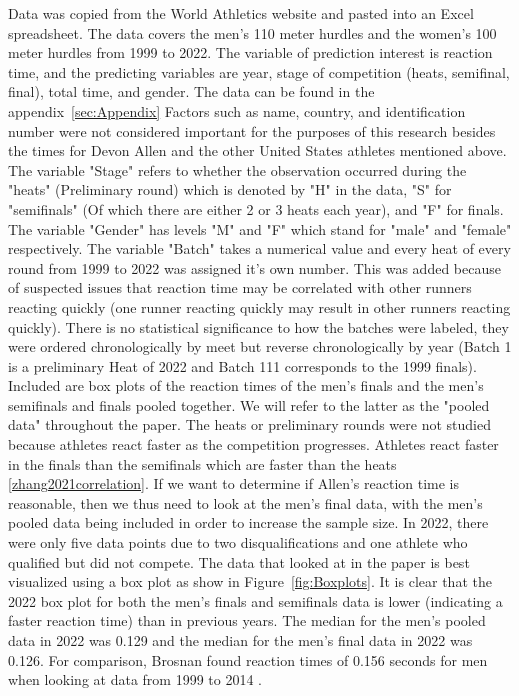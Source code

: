 \documentclass[12pt, letterpaper, titlepage]{article}
\begin{document}
Data was copied from the World Athletics website and pasted into an Excel
spreadsheet. The data covers the men's 110 meter hurdles and the women's 100
meter hurdles from 1999 to 2022.  The variable of prediction interest is reaction
time, and the predicting variables are year, stage of competition (heats, 
semifinal, final), total time, and gender.  The data can be found in the
appendix~\ref{sec:Appendix} 
Factors such as name, country, and identification number were
not considered important for the purposes of this research besides the times for
Devon Allen and the other United States athletes mentioned above.  The variable "Stage"
refers to whether the observation occurred during the "heats" (Preliminary round) which
is denoted by "H" in the data, "S" for "semifinals" (Of which there are either 2 or 3 
heats each year), and "F" for finals. The variable "Gender" has levels "M" and "F" 
which stand for "male" and "female" respectively.  The variable "Batch" takes a 
numerical value and every heat of every round from 1999 to 2022 was assigned it's
own number.  This was added because of suspected issues that reaction time may be
correlated with other runners reacting quickly (one runner reacting quickly may
result in other runners reacting quickly).  There is no statistical significance to
how the batches were labeled, they were ordered chronologically by meet but
reverse chronologically by year (Batch 1 is a preliminary Heat of 2022 and Batch
111 corresponds to the 1999 finals). Included are
box plots of the reaction times of the men's finals and the men's semifinals and
finals pooled together.  We will refer to the latter as the "pooled data"
throughout the paper.  The heats or preliminary rounds were not studied because
athletes react faster as the competition progresses.  Athletes react faster in
the finals than the semifinals which are faster than the heats 
\ref{zhang2021correlation}.  If we want to determine if Allen's reaction time
is reasonable, then we thus need to look at the men's final data, with the men's
pooled data being included in order to increase the sample size.  In 2022, there
were only five data points due to two disqualifications and one athlete who 
qualified but did not compete.
The data that looked at in the paper is best visualized using a box plot as show 
in Figure~\ref{fig:Boxplots}.  It is clear that the 2022 box plot for both the
men's finals and semifinals data is lower (indicating a faster reaction time)
than in previous years.  The median for the men's pooled data in 2022 was 0.129
and the median for the men's final data in 2022 was 0.126.  For comparison,
Brosnan found reaction times of 0.156 seconds for men when looking at data from
1999 to 2014 \citep{brosnan2017effects}.
\end{document}
